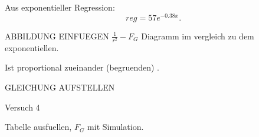 Aus exponentieller Regression: 
\[ reg = 57e^{-0.38x} .\] 



ABBILDUNG EINFUEGEN $\frac{1}{r^2}-F_G$ Diagramm im vergleich zu dem exponentiellen.

Ist proportional zueinander (begruenden) .

GLEICHUNG AUFSTELLEN



Versuch 4

Tabelle ausfuellen, $F_G$ mit Simulation.

